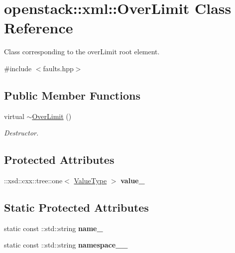 \hypertarget{classopenstack_1_1xml_1_1OverLimit}{
\section{openstack::xml::OverLimit Class Reference}
\label{classopenstack_1_1xml_1_1OverLimit}
}


Class corresponding to the overLimit root element.  




{\ttfamily \#include $<$faults.hpp$>$}

\subsection*{Public Member Functions}
\begin{DoxyCompactItemize}
\item 
\hypertarget{classopenstack_1_1xml_1_1OverLimit_a87ceb1ce4baa562f8053127411539d1c}{
virtual \hyperlink{classopenstack_1_1xml_1_1OverLimit_a87ceb1ce4baa562f8053127411539d1c}{$\sim$OverLimit} ()}
\label{classopenstack_1_1xml_1_1OverLimit_a87ceb1ce4baa562f8053127411539d1c}

\begin{DoxyCompactList}\small\item\em Destructor. \item\end{DoxyCompactList}\end{DoxyCompactItemize}
\subsection*{Protected Attributes}
\begin{DoxyCompactItemize}
\item 
\hypertarget{classopenstack_1_1xml_1_1OverLimit_a20bd3cec92feb28e77cec46e183ac60c}{
::xsd::cxx::tree::one$<$ \hyperlink{classopenstack_1_1xml_1_1OverLimitAPIFault}{ValueType} $>$ {\bfseries value\_\-}}
\label{classopenstack_1_1xml_1_1OverLimit_a20bd3cec92feb28e77cec46e183ac60c}

\end{DoxyCompactItemize}
\subsection*{Static Protected Attributes}
\begin{DoxyCompactItemize}
\item 
\hypertarget{classopenstack_1_1xml_1_1OverLimit_ac51007c852009b8552248c9c5ffd6fd2}{
static const ::std::string {\bfseries name\_\-}}
\label{classopenstack_1_1xml_1_1OverLimit_ac51007c852009b8552248c9c5ffd6fd2}

\item 
\hypertarget{classopenstack_1_1xml_1_1OverLimit_a488a18032fdf0c6e7d289808ad4925e3}{
static const ::std::string {\bfseries namespace\_\-\_\-}}
\label{classopenstack_1_1xml_1_1OverLimit_a488a18032fdf0c6e7d289808ad4925e3}

\end{DoxyCompactItemize}
